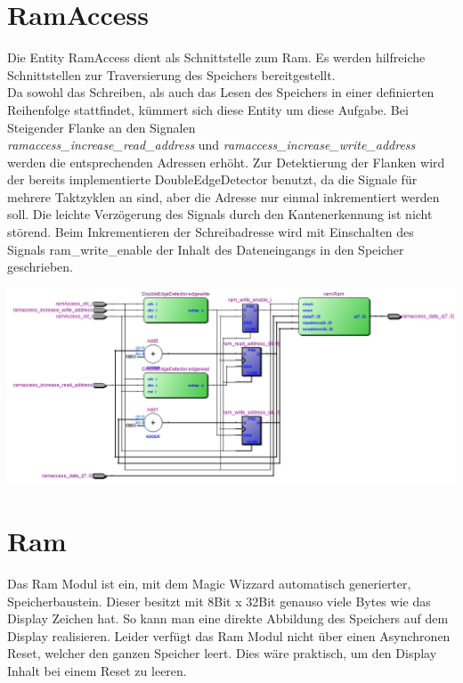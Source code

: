 \documentclass[a4paper,12pt]{report}
\begin{document}
	\section{RamAccess}
		Die Entity RamAccess dient als Schnittstelle zum Ram. Es werden hilfreiche Schnittstellen zur Traversierung des Speichers bereitgestellt.\\
		Da sowohl das Schreiben, als auch das Lesen des Speichers in einer definierten Reihenfolge stattfindet, kümmert sich diese Entity um diese Aufgabe. Bei Steigender Flanke an den Signalen \\ \textit{ramaccess\_increase\_read\_address} und \textit{ramaccess\_increase\_write\_address} werden die entsprechenden Adressen erhöht. Zur Detektierung der Flanken wird der bereits implementierte DoubleEdgeDetector benutzt, da die Signale für mehrere Taktzyklen an sind, aber die Adresse nur einmal inkrementiert werden soll. Die leichte Verzögerung des Signals durch den Kantenerkennung ist nicht störend. Beim Inkrementieren der Schreibadresse wird mit Einschalten des Signals ram\_write\_enable der Inhalt des Dateneingangs in den Speicher geschrieben.
		\begin{center}
			\includegraphics[width=1\textwidth]{assets/RamAccess}
		\end{center}
	
	\section{Ram}
		Das Ram Modul ist ein, mit dem Magic Wizzard automatisch generierter, Speicherbaustein. Dieser besitzt mit 8Bit x 32Bit genauso viele Bytes wie das Display Zeichen hat. So kann man eine direkte Abbildung des Speichers auf dem Display realisieren. Leider verfügt das Ram Modul nicht über einen Asynchronen Reset, welcher den ganzen Speicher leert. Dies wäre praktisch, um den Display Inhalt bei einem Reset zu leeren.
	
\end{document}
